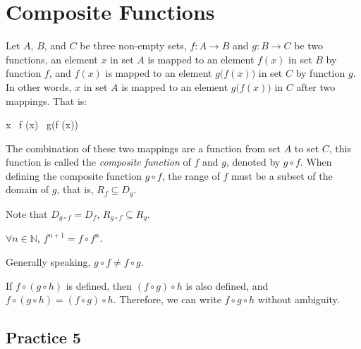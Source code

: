 \documentclass[12pt]{report}
\begin{document}
\newpage

\section{Composite Functions}

Let $A$, $B$, and $C$ be three non-empty sets, $f: A \to B$ and $g: B \to C$ be
two functions, an element $x$ in set $A$ is mapped to an element $f (x)$ in set
$B$ by function $f$, and $f (x)$ is mapped to an element $g\big(f (x)\big)$ in
set $C$ by function $g$. In other words, $x$ in set $A$ is mapped to an element
$g\big(f (x)\big)$ in $C$ after two mappings. That is:
\begin{cequation}
  x\  f (x)\  g\big(f (x)\big)
\end{cequation}

The combination of these two mappings are a function from set $A$ to set $C$,
this function is called the \emph{composite function} of $f$ and $g$, denoted
by $g \circ f$. When defining the composite function $g \circ f$, the range of
$f$ must be a subset of the domain of $g$, that is, $R_f \subseteq D_g$.

Note that $D_{g \circ f} = D_f$, $R_{g \circ f} \subseteq R_g$.

$\forall n \in \mathbb{N}$, $f^{n+1} = f \circ f^n$.

Generally speaking, $g \circ f \neq f \circ g$.

If $f \circ (g \circ h)$ is defined, then $(f \circ g) \circ h$ is also
defined, and $f \circ (g \circ h) = (f \circ g) \circ h$. Therefore, we can
write $f \circ g \circ h$ without ambiguity.

\subsection{Practice 5}
\end{document}
